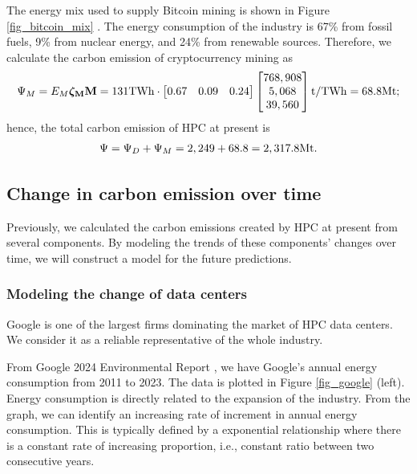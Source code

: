 \documentclass[12pt]{article}
\begin{document}
The energy mix used to supply Bitcoin mining is shown in Figure \ref{fig_bitcoin_mix} \citep{bitcoin_mix}. The energy consumption of the industry is 67\% from fossil fuels, 9\% from nuclear energy, and 24\% from renewable sources. Therefore, we calculate the carbon emission of cryptocurrency mining as
\begin{equation}
	\Psi_M = E_M \boldsymbol{\rm \zeta_M} \vb{M}
	= 131 {\rm TWh} \cdot \begin{bmatrix}
		0.67 & 0.09 & 0.24
	\end{bmatrix}\begin{bmatrix}
		768,908 \\ 5,068 \\ 39,560
	\end{bmatrix} {\rm t/TWh}
	= 68.8 {\rm Mt};
\end{equation}
hence, the total carbon emission of HPC at present is
\begin{equation}
	\Psi = \Psi_D + \Psi_M = 2,249 + 68.8 = 2,317.8 {\rm Mt}.
\end{equation}

\subsection{Change in carbon emission over time}

Previously, we calculated the carbon emissions created by HPC at present from several components. By modeling the trends of these components' changes over time, we will construct a model for the future predictions.

\subsubsection{Modeling the change of data centers}

Google is one of the largest firms dominating the market of HPC data centers. We consider it as a reliable representative of the whole industry.

From Google 2024 Environmental Report \citep{google_report}, we have Google's annual energy consumption from 2011 to 2023. The data is plotted in Figure \ref{fig_google} (left). Energy consumption is directly related to the expansion of the industry. From the graph, we can identify an increasing rate of increment in annual energy consumption. This is typically defined by a exponential relationship where there is a constant rate of increasing proportion, i.e., constant ratio between two consecutive years.
\end{document}
